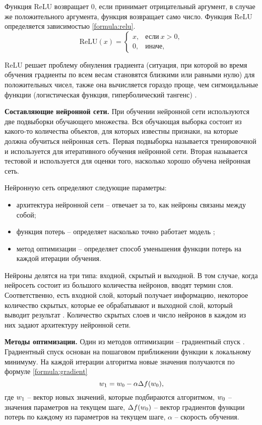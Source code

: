 Функция ReLU возвращает 0, если принимает отрицательный аргумент, в случае же положительного аргумента, функция возвращает само число. 
Функция ReLU определяется зависимостью \ref{formula:relu}.
\begin{equation}\label{formula:relu}
\mathrm{ReLU}(x)=\begin{cases}
x, & \text{если}\ x>0, \\
0, & \text{иначе},
\end{cases}
\end{equation} 

ReLU решает проблему обнуления градиента (ситуация, при которой во время обучения градиенты по всем весам становятся близкими или равными нулю) для положительных чисел, также она вычисляется гораздо проще, чем сигмоидальные функции (логистическая функция, гиперболический тангенс) \cite{activation_function}.

\textbf{Составляющие нейронной сети.}
При обучении нейронной сети используются две подвыборки обучающего множества.
Вся обучающая выборка состоит из какого-то количества объектов, для которых известны признаки, на которые должна обучиться нейронная сеть. 
Первая подвыборка называется тренировочной и используется для итеративного обучения нейронной сети. 
Вторая называется тестовой и используется для оценки того, насколько хорошо обучена нейронная сеть.

Нейронную сеть определяют следующие параметры:
\begin{itemize}
	\item архитектура нейронной сети -- отвечает за то, как нейроны связаны между собой;
	\item функция потерь -- определяет насколько точно работает модель \cite{neuro_base};
	\item метод оптимизации -- определяет способ уменьшения функции потерь на каждой итерации обучения.
\end{itemize}

Нейроны делятся на три типа: входной, скрытый и выходной. 
В том случае, когда нейросеть состоит из большого количества нейронов, вводят термин слоя. 
Соответственно, есть входной слой, который получает информацию, некоторое количество скрытых, которые ее обрабатывают и выходной слой, который выводит результат \cite{neuro_architecture}. 
Количество скрытых слоев и число нейронов в каждом из них задают архитектуру нейронной сети.

\textbf{Методы оптимизации.}
Один из методов оптимизации -- градиентный спуск \cite{gradient}. 
Градиентный спуск основан на пошаговом приближении функции к локальному минимуму. 
На каждой итерации алгоритма новые значения получаются по формуле \ref{formula:gradient}
\begin{equation}\label{formula:gradient}
w_{\rm{1}} = w_{\rm{0}} - \alpha\Delta f(w_{\rm{0}}),
\end{equation}
где $w_{\rm{1}}$ -- вектор новых значений, которые подбираются алгоритмом, $w_{\rm{0}}$ -- значения параметров на текущем шаге, $\Delta f(w_{\rm{0}})$ -- вектор градиентов функции потерь по каждому из параметров на текущем шаге, $\alpha$ -- скорость обучения. 

